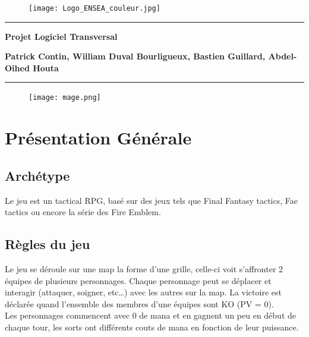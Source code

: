 \documentclass[a4paper,12pt]{article}
\newcommand{\HRule}{\rule{\linewidth}{0.5mm}}
\begin{document}
\thispagestyle{empty}

\begin{titlepage}

\begin{figure}[h]
\begin{center}
\texttt{[image: Logo\_ENSEA\_couleur.jpg]}
\end{center}
\end{figure}

\vspace*{2.5cm}
\HRule
\vspace{0.5cm}
\begin{center}\textbf{\Huge Projet Logiciel Transversal}\end{center}{\Large \par}

\begin{center}\textbf{\large Patrick Contin, William Duval Bourligueux, Bastien Guillard, Abdel-Oihed Houta}\end{center}{\large \par}

\HRule
\vspace{2cm}

\begin{figure}[h]
\begin{center}
\texttt{[image: mage.png]}
\end{center}
\end{figure}


\clearpage

{\small
\tableofcontents
}

\end{titlepage}

\clearpage
\section{Présentation Générale}

\subsection{Archétype}

Le jeu est un tactical RPG, basé sur des jeux tels que Final Fantasy
tactics, Fae tactics ou encore la série des Fire Emblem.

\subsection{Règles du jeu}

Le jeu se déroule sur une map la forme d'une grille, celle-ci voit 
s'affronter 2 équipes de plusieurs personnages. Chaque personnage peut se 
déplacer et interagir (attaquer, soigner, etc\dots) avec les autres sur la map.
La victoire est déclarée quand l'ensemble des membres d'une équipes 
sont KO (PV = 0). \\
Les personnages commencent avec 0 de mana et en gagnent un peu en début de chaque tour, les sorts ont différents couts de mana en fonction de leur puissance.
\end{document}

